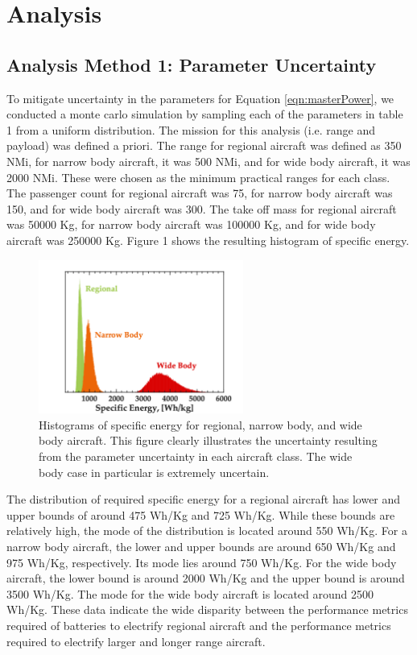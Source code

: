 \documentclass{achemso}
\begin{document}
\section{Analysis}


\subsection{Analysis Method 1: Parameter Uncertainty}
To mitigate uncertainty in the parameters for Equation \eqref{eqn:masterPower}, we conducted a monte carlo simulation by sampling each of the parameters in table 1 from a uniform distribution. The mission for this analysis (i.e. range and payload) was defined a priori.  The range for regional aircraft was defined as 350 NMi, for narrow body aircraft, it was 500 NMi, and for wide body aircraft, it was 2000 NMi. These were chosen as the minimum practical ranges for each class. The passenger count for regional aircraft was 75, for narrow body aircraft was 150, and for wide body aircraft was 300. The take off mass for regional aircraft was 50000 Kg, for narrow body aircraft was 100000 Kg, and for wide body aircraft was 250000 Kg. Figure 1 shows the resulting histogram of specific energy.

\begin{figure}[htp]
\centering

\includegraphics[width=0.6\textwidth]{Figures/histograms.png}

\caption{Histograms of specific energy for regional, narrow body, and wide body aircraft. This figure clearly illustrates the uncertainty resulting from the parameter uncertainty in each aircraft class. The wide body case in particular is extremely uncertain.}
\label{fig:figure1}

\end{figure}

The distribution of required specific energy for a regional aircraft has lower and upper bounds of around 475 Wh/Kg and 725 Wh/Kg. While these bounds are relatively high, the mode of the distribution is located around 550 Wh/Kg. For a narrow body aircraft, the lower and upper bounds are around 650 Wh/Kg and 975 Wh/Kg, respectively. Its mode lies around 750 Wh/Kg. For the wide body aircraft, the lower bound is around 2000 Wh/Kg and the upper bound is around 3500 Wh/Kg. The mode for the wide body aircraft is located around 2500 Wh/Kg. These data indicate the wide disparity between the performance metrics required of batteries to electrify regional aircraft and the performance metrics required to electrify larger and longer range aircraft. 
\end{document}
